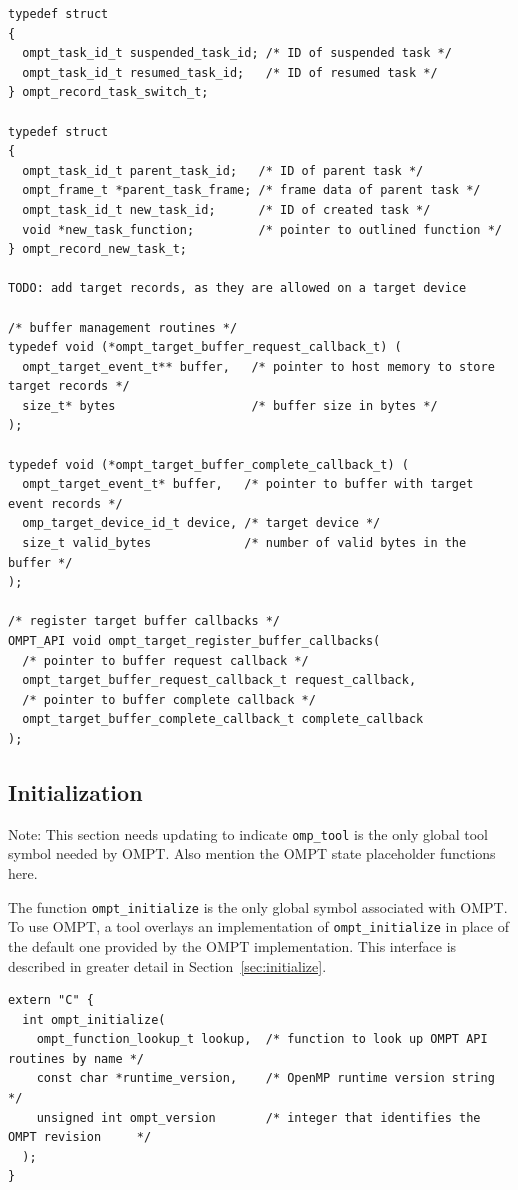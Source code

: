 \documentclass{article}
\begin{document}
\begin{verbatim}
typedef struct
{
  ompt_task_id_t suspended_task_id; /* ID of suspended task */
  ompt_task_id_t resumed_task_id;   /* ID of resumed task */
} ompt_record_task_switch_t;

typedef struct
{
  ompt_task_id_t parent_task_id;   /* ID of parent task */
  ompt_frame_t *parent_task_frame; /* frame data of parent task */
  ompt_task_id_t new_task_id;      /* ID of created task */
  void *new_task_function;         /* pointer to outlined function */
} ompt_record_new_task_t;

TODO: add target records, as they are allowed on a target device

/* buffer management routines */
typedef void (*ompt_target_buffer_request_callback_t) (
  ompt_target_event_t** buffer,   /* pointer to host memory to store target records */
  size_t* bytes                   /* buffer size in bytes */
);
  
typedef void (*ompt_target_buffer_complete_callback_t) (
  ompt_target_event_t* buffer,   /* pointer to buffer with target event records */
  omp_target_device_id_t device, /* target device */
  size_t valid_bytes             /* number of valid bytes in the buffer */
);

/* register target buffer callbacks */
OMPT_API void ompt_target_register_buffer_callbacks(
  /* pointer to buffer request callback */
  ompt_target_buffer_request_callback_t request_callback,
  /* pointer to buffer complete callback */
  ompt_target_buffer_complete_callback_t complete_callback 
);
\end{verbatim}

\clearpage
\subsection{Initialization} 
\label{sec:app:init}

\noindent
{\color{red} Note: This section needs updating to indicate \verb|omp_tool| is the only global tool symbol needed by OMPT. Also mention the OMPT state placeholder functions here.}

The function \verb|ompt_initialize| is the only global symbol associated with OMPT. To use OMPT, a tool overlays an implementation of \verb|ompt_initialize| in place of the default one provided by the OMPT implementation. This interface is described in greater detail in Section~\ref{sec:initialize}.
\begin{verbatim}
extern "C" {
  int ompt_initialize(
    ompt_function_lookup_t lookup,  /* function to look up OMPT API routines by name */
    const char *runtime_version,    /* OpenMP runtime version string                 */
    unsigned int ompt_version       /* integer that identifies the OMPT revision     */
  );
}

\end{verbatim}
\end{document}
